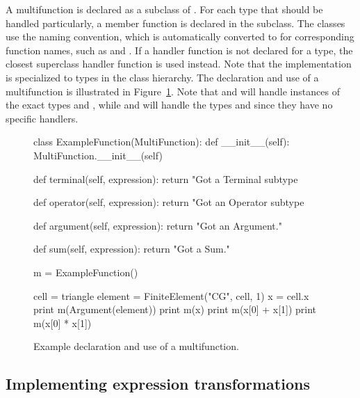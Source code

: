A multifunction is declared as a subclass of . For each
type that should be handled particularly, a member function is declared
in the subclass.  The  classes use the  naming
convention, which is automatically converted to 
for corresponding function names, such as  and
.  If a handler function is not declared for a type,
the closest superclass handler function is used instead.  Note that
the  implementation is specialized to types in the
 class hierarchy.  The declaration and use of a multifunction
is illustrated in Figure~\ref{ufl:fig:examplefunction}.  Note that
 and  will handle instances of the exact types
 and , while  and 
will handle the types  and  since
they have no specific handlers.

\begin{figure}
\begin{python}
class ExampleFunction(MultiFunction):
    def __init__(self):
        MultiFunction.__init__(self)

    def terminal(self, expression):
        return "Got a Terminal subtype %

    def operator(self, expression):
        return "Got an Operator subtype %

    def argument(self, expression):
        return "Got an Argument."

    def sum(self, expression):
        return "Got a Sum."

m = ExampleFunction()

cell = triangle
element = FiniteElement("CG", cell, 1)
x = cell.x
print m(Argument(element))
print m(x)
print m(x[0] + x[1])
print m(x[0] * x[1])
\end{python}
\caption{Example declaration and use of a multifunction.}
\label{ufl:fig:examplefunction}
\end{figure}
\subsection{Implementing expression transformations}
\label{ufl:sec:transformer}

